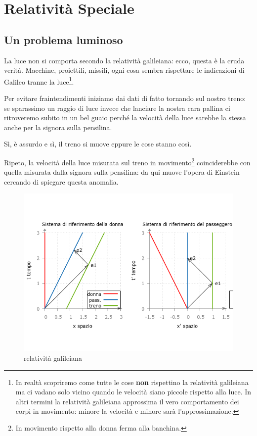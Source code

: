﻿\chapter{Relatività Speciale}

\section{Un problema luminoso}

La luce non si comporta secondo la relatività galileiana: ecco, questa è la cruda verità. Macchine, proiettili, missili, ogni cosa sembra rispettare le indicazioni di Galileo tranne la luce\footnote{In realtà scopriremo come tutte le cose \textbf{non} rispettino la relatività galileiana ma ci vadano solo vicino quando le velocità siano piccole rispetto alla luce. In altri termini la relatività galileiana approssima il vero comportamento dei corpi in movimento: minore la velocità e minore sarà l'approssimazione.}.

Per evitare fraintendimenti iniziamo dai dati di fatto tornando sul nostro treno: se  sparassimo un raggio di luce invece che lanciare la nostra cara pallina ci ritroveremo subito in un bel guaio perché la velocità della luce sarebbe la stessa anche per la signora sulla pensilina. 

Sì, è assurdo e sì, il treno si muove eppure le cose stanno così.

Ripeto, la velocità della luce misurata sul treno in movimento\footnote{In movimento rispetto alla donna ferma alla banchina.} coinciderebbe con quella misurata dalla signora sulla pensilina: da qui muove l’opera di Einstein cercando di spiegare questa anomalia. 

\begin{figure}[h!]
 \centering
 \includegraphics[scale=0.7]{figure/fig8}
 \caption{relatività galileiana}
\end{figure}



